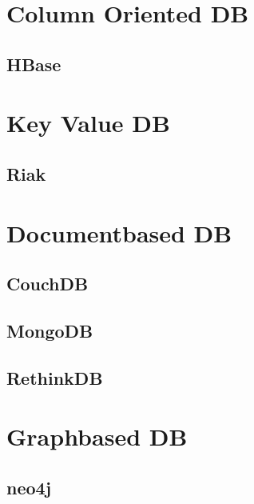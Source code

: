 \part{Column Oriented DB}
\chapter{HBase}


\part{Key Value DB}
\chapter{Riak}





\part{Documentbased DB}
 
\chapter{CouchDB}

%
%
%
%

\chapter{MongoDB}







\chapter{RethinkDB}



\part{Graphbased DB}
\chapter{neo4j}

